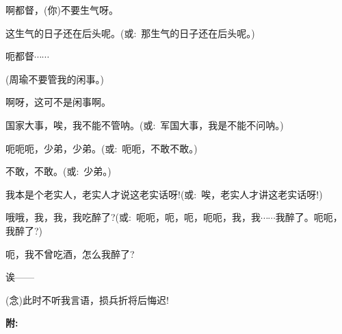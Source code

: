 {{啊都督，(你)不要生气呀。}

{这生气的日子还在后头呢。({\akai 或}:~那生气的日子还在后头呢。)}

{呃都督$\cdots{}\cdots{}$}

{(周瑜\hspace{30pt}不要管我的闲事。)}

{啊呀，这可不是闲事啊。}

{国家大事，唉，我不能不管呐。({\akai 或}:~军国大事，我是不能不问呐。)}

{呃呃呃，少弟，少弟。({\akai 或}:~呃呃，不敢不敢。)}

{不敢，不敢。({\akai 或}:~少弟。)}

{我本是个老实人，老实人才说这老实话呀!({\akai 或}:~唉，老实人才讲这老实话呀!)}

{哦哦，我，我，我吃醉了?({\akai 或}:~呃呃，呃，呃，呃呃，我，我$\cdots{}\cdots{}$我醉了。呃呃，我醉了?)}

{呃，我不曾吃酒，怎么我醉了?}

{诶------}

{({\akai 念})此时不听我言语，损兵折将后悔迟!}
}

\newpage
{} %
{\bfseries\hwfs 附:~}
\vspace{20pt}

